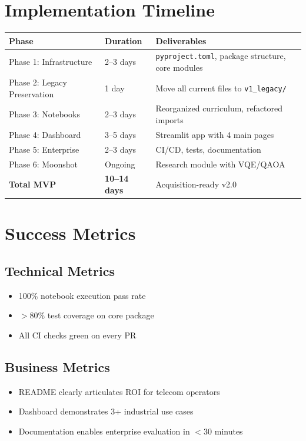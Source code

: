 \documentclass[11pt,a4paper]{article}
\begin{document}
\section{Implementation Timeline}

\begin{longtable}{lp{3cm}p{6cm}}
\toprule
\textbf{Phase} & \textbf{Duration} & \textbf{Deliverables} \\
\midrule
\endhead
Phase 1: Infrastructure & 2--3 days & \texttt{pyproject.toml}, package structure, core modules \\
Phase 2: Legacy Preservation & 1 day & Move all current files to \texttt{v1\_legacy/} \\
Phase 3: Notebooks & 2--3 days & Reorganized curriculum, refactored imports \\
Phase 4: Dashboard & 3--5 days & Streamlit app with 4 main pages \\
Phase 5: Enterprise & 2--3 days & CI/CD, tests, documentation \\
Phase 6: Moonshot & Ongoing & Research module with VQE/QAOA \\
\midrule
\textbf{Total MVP} & \textbf{10--14 days} & Acquisition-ready v2.0 \\
\bottomrule
\end{longtable}

\section{Success Metrics}

\subsection{Technical Metrics}
\begin{itemize}
    \item 100\% notebook execution pass rate
    \item $>$80\% test coverage on core package
    \item All CI checks green on every PR
\end{itemize}

\subsection{Business Metrics}
\begin{itemize}
    \item README clearly articulates ROI for telecom operators
    \item Dashboard demonstrates 3+ industrial use cases
    \item Documentation enables enterprise evaluation in $<$30 minutes
\end{itemize}
\end{document}
